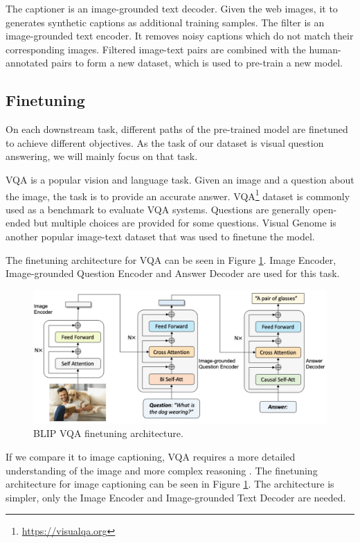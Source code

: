 \documentclass[11pt]{article}
\begin{document}
The captioner is an image-grounded text decoder. Given the web images, it to generates synthetic captions as additional training samples. The filter is an image-grounded text encoder. It removes noisy captions which do not match their corresponding images. Filtered image-text pairs are combined with the human-annotated pairs to form a new dataset, which is used to pre-train a new model.

\subsection{Finetuning}

On each downstream task, different paths of the pre-trained model are finetuned to achieve different objectives. As the task of our dataset is visual question answering, we will mainly focus on that task.

VQA \cite{antol2015vqa} is a popular vision and language task. Given an image and a question about the image, the task is to provide an accurate answer. VQA\footnote{\url{https://visualqa.org}} dataset is commonly used as a benchmark to evaluate VQA systems. Questions are generally open-ended but multiple choices are provided for some questions. Visual Genome \cite{krishna2017visual} is another popular image-text dataset that was used to finetune the model.

The finetuning architecture for VQA can be seen in Figure \ref{fig:vqa_example}. Image Encoder, Image-grounded Question Encoder and Answer Decoder are used for this task.

\begin{figure}
    \centering
    \includegraphics[width=\linewidth]{vqa_example.png}
    \caption{BLIP VQA finetuning architecture.}
    \label{fig:vqa_example}
\end{figure}

If we compare it to image captioning, VQA requires a more detailed understanding of the image and more complex reasoning \cite{antol2015vqa}. The finetuning architecture for image captioning can be seen in Figure \ref{fig:vqa_example}. The architecture is simpler, only the Image Encoder and Image-grounded Text Decoder are needed.
\end{document}

